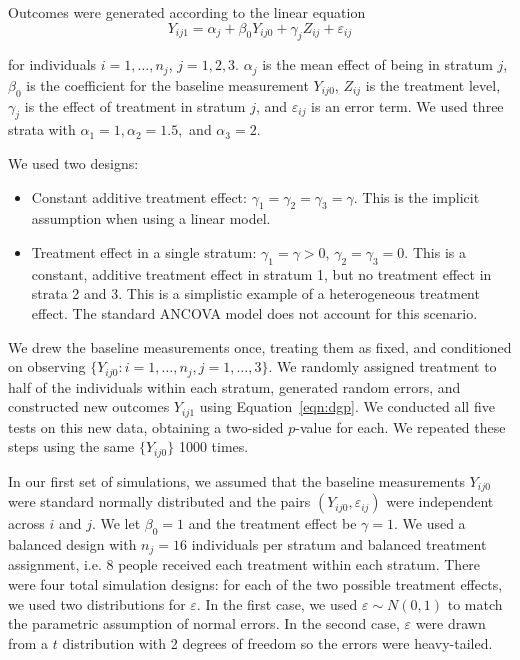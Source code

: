 \documentclass[12pt]{article}
\begin{document}
Outcomes were generated according to the linear equation 
\begin{equation}\label{eqn:dgp}
Y_{ij1} =\alpha_j + \beta_0Y_{ij0} + \gamma_j Z_{ij} + \varepsilon_{ij}
\end{equation}

\noindent for individuals $i = 1, \dots, n_j$, $j = 1, 2, 3$.
$\alpha_j$ is the mean effect of being in stratum $j$, 
$\beta_0$ is the coefficient for the baseline measurement $Y_{ij0}$, 
$Z_{ij}$ is the treatment level, 
$\gamma_j$ is the effect of treatment in stratum $j$, 
and $\varepsilon_{ij}$ is an error term.
We used three strata with $\alpha_1 = 1, \alpha_2 = 1.5,$ and $\alpha_3 = 2$.

We used two designs:
\begin{itemize}
\item Constant additive treatment effect: $\gamma_1 = \gamma_2 = \gamma_3 = \gamma$. This is the implicit assumption when using a linear model.
\item Treatment effect in a single stratum: $\gamma_1 = \gamma > 0$, $\gamma_2 = \gamma_3 = 0$. This is a constant, additive treatment effect in stratum 1, but no treatment effect in strata 2 and 3. This is a simplistic example of a heterogeneous treatment effect. The standard ANCOVA model does not account for this scenario.
\end{itemize}

\noindent We drew the baseline measurements once, treating them as fixed, and conditioned on observing $\{ Y_{ij0} : {i = 1,\dots,n_j, j = 1,\dots, 3}\}$.
We randomly assigned treatment to half of the individuals within each stratum, generated random errors, and constructed new outcomes $Y_{ij1}$ using Equation~\ref{eqn:dgp}.
We conducted all five tests on this new data, obtaining a two-sided $p$-value for each.
We repeated these steps using the same $\{ Y_{ij0} \}$ 1000 times.

In our first set of simulations, we assumed that the baseline measurements $Y_{ij0}$ were standard normally distributed and the pairs $(Y_{ij0}, \varepsilon_{ij})$ were independent across $i$ and $j$.
We let $\beta_0 = 1$ and the treatment effect be $\gamma = 1$.
We used a balanced design with $n_j = 16$ individuals per stratum and balanced treatment assignment, i.e. 8 people received each treatment within each stratum.
There were four total simulation designs:
for each of the two possible treatment effects, we used two distributions for $\varepsilon$.
In the first case, we used $\varepsilon \sim N(0, 1)$ to match the parametric assumption of normal errors.
In the second case, $\varepsilon$ were drawn from a $t$ distribution with 2 degrees of freedom so the errors were heavy-tailed.
\end{document}
